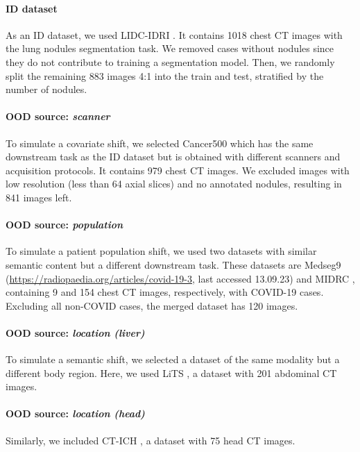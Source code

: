 

\paragraph{ID dataset}
As an ID dataset, we used LIDC-IDRI \cite{lidc}. It contains 1018 chest CT images with the lung nodules segmentation task. We removed cases without nodules since they do not contribute to training a segmentation model. Then, we randomly split the remaining 883 images 4:1 into the train and test, stratified by the number of nodules.

\paragraph{OOD source: \textit{scanner}}
To simulate a covariate shift, we selected Cancer500 \cite{morozov2021simplified} which has the same downstream task as the ID dataset but is obtained with different scanners and acquisition protocols. It contains 979 chest CT images. We excluded images with low resolution (less than 64 axial slices) and no annotated nodules, resulting in 841 images left.

\paragraph{OOD source: \textit{population}}
To simulate a patient population shift, we used two datasets with similar semantic content but a different downstream task. These datasets are Medseg9 ({\url{https://radiopaedia.org/articles/covid-19-3}}, last accessed 13.09.23) and MIDRC \cite{tsai2021rsna}, containing 9 and 154 chest CT images, respectively, with COVID-19 cases. Excluding all non-COVID cases, the merged dataset has 120 images.

\paragraph{OOD source: \textit{location (liver)}}
To simulate a semantic shift, we selected a dataset of the same modality but a different body region. Here, we used LiTS \cite{bilic2023liver}, a dataset with 201 abdominal CT images.

\paragraph{OOD source: \textit{location (head)}}
Similarly, we included CT-ICH \cite{hssayeni2020computed}, a dataset with 75 head CT images.

